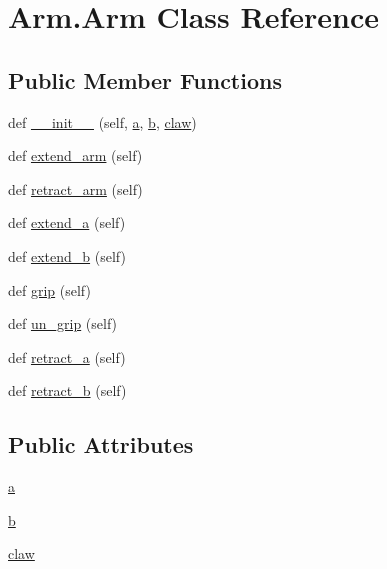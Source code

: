 \hypertarget{class_arm_1_1_arm}{}\section{Arm.\+Arm Class Reference}
\label{class_arm_1_1_arm}
\subsection*{Public Member Functions}
\begin{DoxyCompactItemize}
\item 
def \mbox{\hyperlink{class_arm_1_1_arm_aa824d8a53e7d3eefe3318654d318290e}{\+\_\+\+\_\+init\+\_\+\+\_\+}} (self, \mbox{\hyperlink{class_arm_1_1_arm_a921108ed0eca55348c01811141009fdf}{a}}, \mbox{\hyperlink{class_arm_1_1_arm_a0cc68385222efa1318c95a5d1226773c}{b}}, \mbox{\hyperlink{class_arm_1_1_arm_ab07711ba5be70642e2cc07fe4e749722}{claw}})
\item 
def \mbox{\hyperlink{class_arm_1_1_arm_ad71a3d5f203842673fab1446ed5fa4d0}{extend\+\_\+arm}} (self)
\item 
def \mbox{\hyperlink{class_arm_1_1_arm_ad80e96cf9cba7fc35c0e2b3bc5c20521}{retract\+\_\+arm}} (self)
\item 
def \mbox{\hyperlink{class_arm_1_1_arm_a8044b0ae39c9d1557263e2bc7e8a6458}{extend\+\_\+a}} (self)
\item 
def \mbox{\hyperlink{class_arm_1_1_arm_a2cb928c3f4875e20c3f1a86e303349c5}{extend\+\_\+b}} (self)
\item 
def \mbox{\hyperlink{class_arm_1_1_arm_adc6b66c321eb919da68759ab0cceb1f9}{grip}} (self)
\item 
def \mbox{\hyperlink{class_arm_1_1_arm_a8f91c12bc43bd155d903bebed7ddf7ad}{un\+\_\+grip}} (self)
\item 
def \mbox{\hyperlink{class_arm_1_1_arm_ab5d57caa9e3c9ba55f03c75216e659d4}{retract\+\_\+a}} (self)
\item 
def \mbox{\hyperlink{class_arm_1_1_arm_a0bee7d96a870674ecce215bbd4faf1d5}{retract\+\_\+b}} (self)
\end{DoxyCompactItemize}
\subsection*{Public Attributes}
\begin{DoxyCompactItemize}
\item 
\mbox{\hyperlink{class_arm_1_1_arm_a921108ed0eca55348c01811141009fdf}{a}}
\item 
\mbox{\hyperlink{class_arm_1_1_arm_a0cc68385222efa1318c95a5d1226773c}{b}}
\item 
\mbox{\hyperlink{class_arm_1_1_arm_ab07711ba5be70642e2cc07fe4e749722}{claw}}
\end{DoxyCompactItemize}


